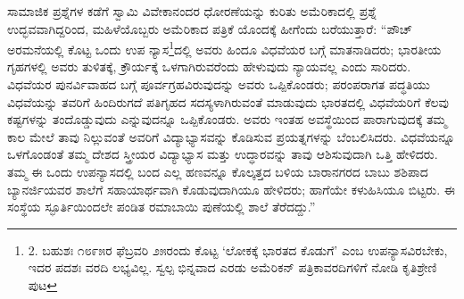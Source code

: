 ಸಾಮಾಜಿಕ ಪ್ರಶ್ನೆಗಳ ಕಡೆಗೆ ಸ್ವಾಮಿ ವಿವೇಕಾನಂದರ ಧೋರಣೆಯನ್ನು ಕುರಿತು ಅಮೆರಿಕಾದಲ್ಲಿ ಪ್ರಶ್ನೆ ಉದ್ಭವವಾಗಿದ್ದರಿಂದ, ಮಹಿಳೆಯೊಬ್ಬರು ಅಮೆರಿಕಾದ ಪತ್ರಿಕೆ ಯೊಂದಕ್ಕೆ ಹೀಗೆಂದು ಬರೆಯುತ್ತಾರೆ: “ಪೌಚ್ ಅರಮನೆಯಲ್ಲಿ ಕೊಟ್ಟ ಒಂದು ಉಪ ನ್ಯಾಸ\footnote{2. ಬಹುಶಃ ೧೮೯೫ರ ಫೆಬ್ರವರಿ ೨೫ರಂದು ಕೊಟ್ಟ ‘ಲೋಕಕ್ಕೆ ಭಾರತದ ಕೊಡುಗೆ’ ಎಂಬ ಉಪನ್ಯಾಸವಿರಬೇಕು, ಇದರ ಪದಶಃ ವರದಿ ಲಭ್ಯವಿಲ್ಲ. ಸ್ವಲ್ಪ ಭಿನ್ನವಾದ ಎರಡು ಅಮೆರಿಕನ್ ಪತ್ರಿಕಾವರದಿಗಳಿಗೆ ನೋಡಿ ಕೃತಿಶ್ರೇಣಿ  ಪುಟ }ದಲ್ಲಿ ಅವರು ಹಿಂದೂ ವಿಧವೆಯರ ಬಗ್ಗೆ ಮಾತನಾಡಿದರು; ಭಾರತೀಯ ಗೃಹಗಳಲ್ಲಿ ಅವರು ತುಳಿತಕ್ಕೆ, ಕ್ರೌರ್ಯಕ್ಕೆ ಒಳಗಾಗಿರುವರೆಂದು ಹೇಳುವುದು ನ್ಯಾಯವಲ್ಲ ಎಂದು ಸಾರಿದರು. ವಿಧವೆಯರ ಪುನರ್ವಿವಾಹದ ಬಗ್ಗೆ ಪೂರ್ವಗ್ರಹವಿರುವುದನ್ನು ಅವರು ಒಪ್ಪಿಕೊಂಡರು; ಪರಂಪರಾಗತ ಪದ್ಧತಿಯು ವಿಧವೆಯನ್ನು ತವರಿಗೆ ಹಿಂದಿರುಗದೆ ಪತಿಗೃಹದ ಸದಸ್ಯಳಾಗಿರುವಂತೆ ಮಾಡುವುದು ಭಾರತದಲ್ಲಿ ವಿಧವೆಯರಿಗೆ ಕೆಲವು ಕಷ್ಟಗಳನ್ನು ತಂದೊಡ್ಡುವುದು ಎನ್ನುವುದನ್ನೂ ಒಪ್ಪಿಕೊಂಡರು. ಅವರು ಇಂತಹ ಅವಸ್ಥೆಯಿಂದ ಪಾರಾಗುವುದಕ್ಕೆ ತಮ್ಮ ಕಾಲ ಮೇಲೆ ತಾವು ನಿಲ್ಲುವಂತೆ ಅವರಿಗೆ ವಿದ್ಯಾಭ್ಯಾಸವನ್ನು ಕೊಡಿಸುವ ಪ್ರಯತ್ನಗಳನ್ನು ಬೆಂಬಲಿಸಿದರು. ವಿಧವೆಯನ್ನೂ ಒಳಗೊಂಡಂತೆ ತಮ್ಮ ದೇಶದ ಸ್ತ್ರೀಯರ ವಿದ್ಯಾಭ್ಯಾಸ ಮತ್ತು ಉದ್ಧಾರವನ್ನು ತಾವು ಆಶಿಸುವುದಾಗಿ ಒತ್ತಿ ಹೇಳಿದರು. ತಮ್ಮ ಈ ಒಂದು ಉಪನ್ಯಾಸದಲ್ಲಿ ಬಂದ ಎಲ್ಲ ಹಣವನ್ನೂ ಕೊಲ್ಕತ್ತದ ಬಳಿಯ ಬಾರಾನಗರದ ಬಾಬು ಶಶಿಪಾದ ಬ್ಯಾನರ್ಜಿಯವರ ಶಾಲೆಗೆ ಸಹಾಯಾರ್ಥವಾಗಿ ಕೊಡುವುದಾಗಿಯೂ ಹೇಳಿದರು; ಹಾಗೆಯೇ ಕಳುಹಿಸಿಯೂ ಬಿಟ್ಟರು. ಈ ಸಂಸ್ಥೆಯ ಸ್ಫೂರ್ತಿಯಿಂದಲೇ ಪಂಡಿತ ರಮಾಬಾಯಿ ಪುಣೆಯಲ್ಲಿ ಶಾಲೆ ತೆರೆದದ್ದು.”

